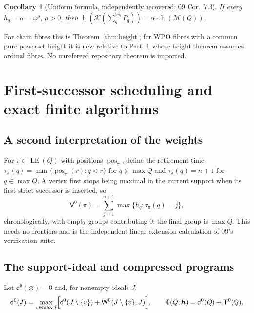 \documentclass[11pt,a4paper]{article}
\newtheorem{corollary}[theorem]{Corollary}
\theoremstyle{definition}
\theoremstyle{remark}
\newcommand{\K}{\mathcal K}
\newcommand{\M}{\mathcal M}
\newcommand{\hgt}{\operatorname{h}}
\newcommand{\LE}{\operatorname{LE}}
\newcommand{\Wz}{\mathsf W^{0}}
\newcommand{\Tz}{\mathsf T^{0}}
\newcommand{\Vz}{\mathsf V^{0}}
\newcommand{\lxsi}{\mathop{\textstyle\sum}\nolimits^{\mathrm{lex}}}
\begin{document}
\begin{corollary}[Uniform formula, independently recovered; 09 Cor.~7.3]
\label{nh:wpo:cor:uniform}
If every $h_q=\alpha=\omega^\rho$, $\rho>0$, then
$\hgt(\K(\lxsi_qP_q))=\alpha\cdot\hgt(\M(Q))$.
\end{corollary}

For chain fibres this is Theorem~\ref{thm:height}; for WPO fibres with a common
pure powerset height it is new relative to Part~I, whose height theorem assumes
ordinal fibres. No unrefereed repository theorem is imported.

\section{First-successor scheduling and exact finite algorithms}
\label{nh:wpo:sec:algorithms}

\subsection{A second interpretation of the weights}

For $\pi\in\LE(Q)$ with positions $\operatorname{pos}_\pi$, define the
retirement time $\tau_\pi(q)=\min\{\operatorname{pos}_\pi(r):q<r\}$ for
$q\notin\max Q$ and $\tau_\pi(q)=n+1$ for $q\in\max Q$. A vertex first stops being
maximal in the current support when its first strict successor is inserted, so
\begin{equation}\label{nh:wpo:eq:firstsuccessor}
 \Vz(\pi)=\sum_{j=1}^{n+1}\max\{h_q:\tau_\pi(q)=j\},
\end{equation}
chronologically, with empty groups contributing $0$; the final group is
$\max Q$. This needs no frontiers and is the independent linear-extension
calculation of 09's verification suite.

\subsection{The support-ideal and compressed programs}

Let $\mathsf d^0(\varnothing)=0$ and, for nonempty ideals $J$,
\begin{equation}\label{nh:wpo:eq:dp}
 \mathsf d^0(J)=\max_{v\in\max J}\Bigl[\mathsf d^0(J\setminus\{v\})+
 \Wz(J\setminus\{v\},J)\Bigr],\qquad \Phi(Q;\boldsymbol h)=\mathsf d^0(Q)+\Tz(Q).
\end{equation}
\end{document}
